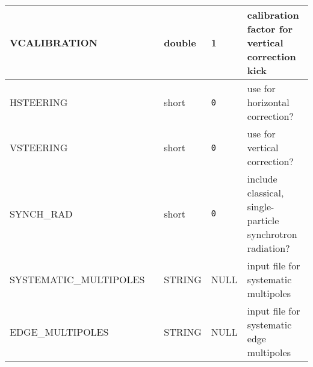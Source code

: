 \begin{tabular}{|l|l|l|l|p{\descwidth}|}
VCALIBRATION &  & double &   1 & calibration factor for vertical correction kick  \\ \hline 
HSTEERING &  & short &  \verb|0| & use for horizontal correction?  \\ \hline 
VSTEERING &  & short &  \verb|0| & use for vertical correction?  \\ \hline 
SYNCH\_RAD &  & short &  \verb|0| & include classical, single-particle synchrotron radiation?  \\ \hline 
SYSTEMATIC\_MULTIPOLES &  & STRING &   NULL            & input file for systematic multipoles  \\ \hline 
EDGE\_MULTIPOLES &  & STRING &   NULL            & input file for systematic edge multipoles  \\ \hline 
\end{tabular}

